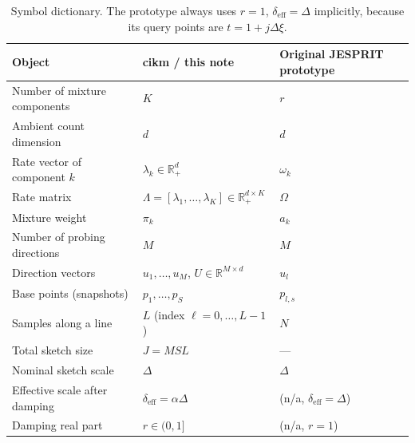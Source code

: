 \documentclass[11pt]{article}
\newcommand{\R}{\mathbb{R}}
\newcommand{\lam}{\bm{\lambda}}
\newcommand{\Lam}{\bm{\Lambda}}
\newcommand{\bu}{\bm{u}}
\newcommand{\bp}{\bm{p}}
\newcommand{\deff}{\delta_{\mathrm{eff}}}
\newcommand{\code}[1]{\texttt{\small #1}}
\def\code#1{#1}%
\def\small{}%
\def\bm#1{#1}%
\theoremstyle{definition}
\begin{document}
\begin{table}[h]
\centering
\small
\begin{tabular}{lll}
\toprule
Object & \code{cikm} / this note & Original JESPRIT prototype \\
\midrule
Number of mixture components & $K$ & $r$ \\
Ambient count dimension & $d$ & $d$ \\
Rate vector of component $k$ & $\lam_k \in \R^d_+$ & $\bm{\omega}_k$ \\
Rate matrix & $\Lam = [\lam_1,\dots,\lam_K] \in \R^{d\times K}_+$ & $\Omega$ \\
Mixture weight & $\pi_k$ & $a_k$ \\
Number of probing directions & $M$ & $M$ \\
Direction vectors & $\bu_1,\dots,\bu_M$, $U\in\R^{M\times d}$ & $\bu_l$ \\
Base points (snapshots) & $\bp_1,\dots,\bp_S$ & $\bp_{l,s}$ \\
Samples along a line & $L$ (index $\ell=0,\dots,L-1$) & $N$ \\
Total sketch size & $J = M S L$ & --- \\
Nominal sketch scale & $\Delta$ & $\Delta$ \\
Effective scale after damping & $\deff = \alpha\Delta$ & (n/a, $\deff=\Delta$) \\
Damping real part & $r \in (0,1]$ & (n/a, $r=1$) \\
\bottomrule
\end{tabular}
\caption{Symbol dictionary. The prototype always uses $r=1$, $\deff=\Delta$ implicitly,
because its query points are $t = 1 + j\Delta\xi$.}
\label{tab:notation}
\end{table}
\end{document}
